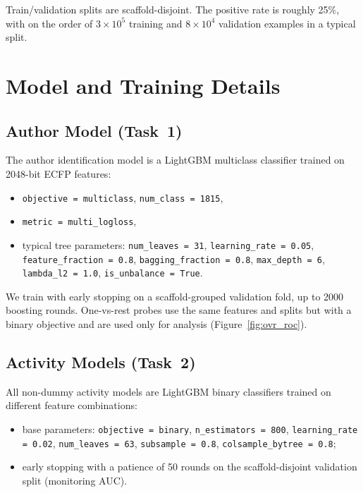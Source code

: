 \documentclass[11pt]{article}
\begin{document}
Train/validation splits are scaffold-disjoint. The positive rate is roughly 25\%, with on the order of $3\times 10^5$ training and $8\times 10^4$ validation examples in a typical split.

\section{Model and Training Details}\label{app:model-details}

\subsection{Author Model (Task~1)}

The author identification model is a LightGBM multiclass classifier trained on 2048-bit ECFP features:

\begin{itemize}[leftmargin=1.5em,itemsep=0.25em]
  \item \texttt{objective = multiclass}, \texttt{num\_class = 1815},
  \item \texttt{metric = multi\_logloss},
  \item typical tree parameters: \texttt{num\_leaves = 31}, \texttt{learning\_rate = 0.05}, \texttt{feature\_fraction = 0.8}, \texttt{bagging\_fraction = 0.8}, \texttt{max\_depth = 6}, \texttt{lambda\_l2 = 1.0}, \texttt{is\_unbalance = True}.
\end{itemize}

We train with early stopping on a scaffold-grouped validation fold, up to 2000 boosting rounds. One-vs-rest probes use the same features and splits but with a binary objective and are used only for analysis (Figure~\ref{fig:ovr_roc}).

\subsection{Activity Models (Task~2)}

All non-dummy activity models are LightGBM binary classifiers trained on different feature combinations:

\begin{itemize}[leftmargin=1.5em,itemsep=0.25em]
  \item base parameters: \texttt{objective = binary}, \texttt{n\_estimators = 800}, \texttt{learning\_rate = 0.02}, \texttt{num\_leaves = 63}, \texttt{subsample = 0.8}, \texttt{colsample\_bytree = 0.8};
  \item early stopping with a patience of 50 rounds on the scaffold-disjoint validation split (monitoring AUC).
\end{itemize}
\end{document}
